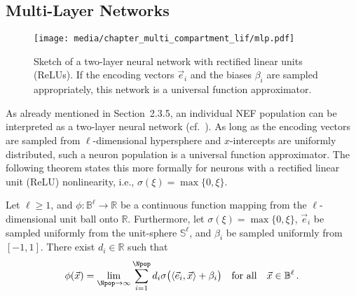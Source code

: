 
\subsection{Multi-Layer Networks}

\begin{figure}
	\texttt{[image: media/chapter\_multi\_compartment\_lif/mlp.pdf]}
	\caption[Sketch of a two-layer neural network]{Sketch of a two-layer neural network with rectified linear units (ReLUs). If the encoding vectors $\vec e_i$ and the biases $\beta_i$ are sampled appropriately, this network is a universal function approximator.}
	\label{fig:mlp}
\end{figure}

As already mentioned in Section~2.3.5, an individual NEF population can be interpreted as a two-layer neural network (cf.~).
As long as the encoding vectors are sampled from $\ell$-dimensional hypersphere and $x$-intercepts are uniformly distributed, such a neuron population is a universal function approximator.
The following theorem states this more formally for neurons with a rectified linear unit (ReLU) nonlinearity, i.e., $\sigma(\xi) = \max\{0, \xi\}$.

\begin{theorem}
\label{thm:two_layer_universal}
Let $\ell \geq 1$, and $\phi : \mathbb{B}^\ell \longrightarrow \mathbb{R}$ be a continuous function mapping from the $\ell$-dimensional unit ball onto $\mathbb{R}$.
Furthermore, let $\sigma(\xi) = \max\{0, \xi\}$, $\vec e_i$ be sampled uniformly from the unit-sphere $\mathbb{S}^\ell$, and $\beta_i$ be sampled uniformly from $[-1, 1]$.
There exist $d_i \in \mathbb{R}$ such that
\begin{align}
	\phi(\vec x) = \lim_{\Npop \to \infty} \sum_{i = 1}^{\Npop} d_i \sigma\bigl( \langle \vec e_i, \vec x \rangle + \beta_i \bigr) \quad \text{for all} \quad \vec x \in \mathbb{B}^\ell \,.
	\label{eqn:two_layer_network}
\end{align}
\end{theorem}

